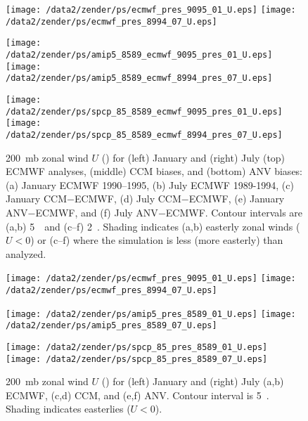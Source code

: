 \documentclass[twocolumn,final]{article}
\begin{document}
\begin{figure*}
\begin{center}
\texttt{[image: /data2/zender/ps/ecmwf\_pres\_9095\_01\_U.eps]}%
\texttt{[image: /data2/zender/ps/ecmwf\_pres\_8994\_07\_U.eps]}%

\texttt{[image: /data2/zender/ps/amip5\_8589\_ecmwf\_9095\_pres\_01\_U.eps]}%
\texttt{[image: /data2/zender/ps/amip5\_8589\_ecmwf\_8994\_pres\_07\_U.eps]}%

\texttt{[image: /data2/zender/ps/spcp\_85\_8589\_ecmwf\_9095\_pres\_01\_U.eps]}%
\texttt{[image: /data2/zender/ps/spcp\_85\_8589\_ecmwf\_8994\_pres\_07\_U.eps]}%
\end{center}
\caption[200~mb zonal wind $U$ for January and July ECMWF analyses,
CCM biases, and ANV biases]{ 
200~mb zonal wind $U$ (\mxs) for (left) January and (right) July (top)
ECMWF analyses, (middle) CCM biases, and (bottom) ANV biases: (a)
January ECMWF 1990--1995, (b) July ECMWF 1989-1994, (c) January
CCM$-$ECMWF, (d) July CCM$-$ECMWF, (e) January ANV$-$ECMWF, and (f)
July ANV$-$ECMWF. 
Contour intervals are (a,b) 5~\mxs\ and (c--f) 2~\mxs. 
Shading indicates (a,b) easterly zonal winds ($U < 0$) or (c--f) where
the simulation is less (more easterly) than analyzed.
\label{fig:pres_8589_U}}   
\end{figure*}
\clearpage

\begin{figure*}
\begin{center}
\texttt{[image: /data2/zender/ps/ecmwf\_pres\_9095\_01\_U.eps]}%
\texttt{[image: /data2/zender/ps/ecmwf\_pres\_8994\_07\_U.eps]}%

\texttt{[image: /data2/zender/ps/amip5\_pres\_8589\_01\_U.eps]}%
\texttt{[image: /data2/zender/ps/amip5\_pres\_8589\_07\_U.eps]}%

\texttt{[image: /data2/zender/ps/spcp\_85\_pres\_8589\_01\_U.eps]}%
\texttt{[image: /data2/zender/ps/spcp\_85\_pres\_8589\_07\_U.eps]}%
\end{center}
\caption[200~mb zonal wind $U$ for January and July ECMWF, CCM,
and ANV]{ 
200~mb zonal wind $U$ (\mxs) for (left) January and (right) July (a,b)
ECMWF, (c,d) CCM, and (e,f) ANV. 
Contour interval is 5~\mxs.
Shading indicates easterlies ($U < 0$).
\label{fig:pres_8589_U}}
\end{figure*}
\clearpage
\end{document}
